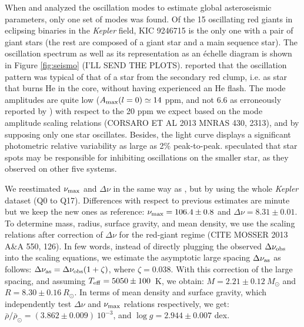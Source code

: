 When \citet{gau13} and \citet{gau14} analyzed the oscillation modes to estimate global asteroseismic parameters, only one set of modes was found. Of the 15 oscillating red giants in eclipsing binaries in the \emph{Kepler} field, KIC 9246715 is the only one with a pair of giant stars (the rest are composed of a giant star and a main sequence star). The oscillation spectrum as well as its representation as an \'echelle diagram is shown in Figure \ref{fig:seismo} (I'LL SEND THE PLOTS). \citealt{gau14} reported that the oscillation pattern was typical of that of a star from the secondary red clump, i.e. as star that burns He in the core, without having experienced an He flash. The mode amplitudes are quite low ($A_{\rm{max}}(l=0) \simeq 14$ ppm, and not 6.6 as erroneously reported by \citealt{gau14}) with respect to the 20 ppm we expect  based on the mode amplitude scaling relations (CORSARO ET AL 2013 MNRAS 430, 2313), and by supposing only one star oscillates. Besides, the light curve displays a significant photometric relative variability as large as 2\% peak-to-peak. \citet{gau14} speculated that star spots may be responsible for inhibiting oscillations on the smaller star, as they observed on other five systems. 

We reestimated $\nu_{\rm{max}}$ and $\Delta\nu$ in the same way as \citet{gau14}, but by using the whole \textit{Kepler} dataset (Q0 to Q17). Differences with respect to previous estimates are minute but we keep the new ones as reference: $\nu_{\rm{max}} = 106.4 \pm 0.8$ and $\Delta\nu=8.31\pm0.01$. To determine mass, radius, surface gravity, and mean density, we use the scaling relations after correction of $\Delta\nu$ for the red-giant regime (CITE MOSSER 2013 A\&A 550, 126). In few words, instead of directly plugging the observed $\Delta\nu_{\rm{obs}}$ into the scaling equations, we estimate the asymptotic large spacing $\Delta\nu_{\rm{as}}$ as follows: $\Delta\nu_{\rm{as}} = \Delta\nu_{\rm{obs}} (1 + \zeta)$, where $\zeta = 0.038$. With this correction of the large spacing, and assuming $T_{\rm{eff}} = 5050 \pm 100$~K, we obtain: $M = 2.21 \pm 0.12 \ M_{\odot}$ and $R = 8.30 \pm 0.16 \ R_{\odot}$. In terms of mean density and surface gravity, which independently test $\Delta\nu$  and $\nu_{\rm{max}}$ relations respectively, we get:  $\bar{\rho}/\bar{\rho}_{\odot} = (3.862 \pm 0.009)\ 10 ^{-3}$, and $\log g = 2.944 \pm 0.007$ dex. 


